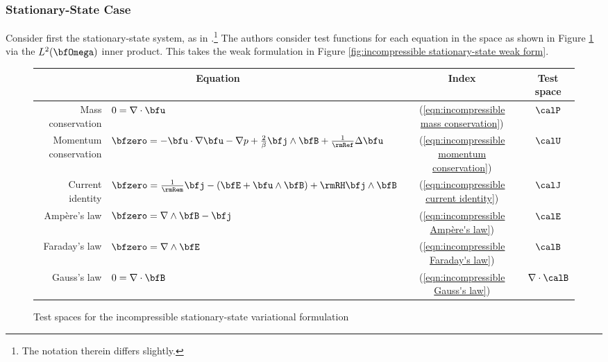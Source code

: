 \subsubsection*{Stationary-State Case}
    Consider first the stationary-state system, as in \cite{LHF22}.\footnote{The notation therein differs slightly.} The authors consider test functions for each equation in the space as shown in Figure \ref{fig:incompressible stationary-state test spaces} via the $L^{2}(\bfOmega)$ inner product. This takes the weak formulation in Figure \ref{fig:incompressible stationary-state weak form}.
    
    \begin{figure}
        \centering
        \begin{tabular}{ r l c | c }
            \multicolumn{2}{c}{Equation}  &  Index  &  Test space  \\
            \hline\hline
            Mass conservation  &  $0  =  \nabla\cdot\bfu$  &  (\ref{eqn:incompressible mass conservation})  &  $\calP$  \\
            Momentum conservation  &  $\bfzero 
             =  - \bfu\cdot\nabla\bfu - \nabla p + \frac{2}{\beta}\bfj\wedge\bfB + \frac{1}{\rmRef}\Delta\bfu$  &  (\ref{eqn:incompressible momentum conservation})  &  $\calU$  \\
            \hline
            Current identity  &  $\bfzero  =  \frac{1}{\rmRem}\bfj - (\bfE + \bfu\wedge\bfB) + \rmRH\bfj\wedge\bfB$  &  (\ref{eqn:incompressible current identity})  &  $\calJ$  \\
            \hline
            Ampère's law  &  $\bfzero  =  \nabla\wedge\bfB - \bfj$  &  (\ref{eqn:incompressible Ampère's law})  &  $\calE$  \\
            Faraday's law  &  $\bfzero  =  \nabla\wedge\bfE$  &  (\ref{eqn:incompressible Faraday's law})  &  $\calB$  \\
            Gauss's law  &  $0  =  \nabla\cdot\bfB$  &  (\ref{eqn:incompressible Gauss's law})  &  $\nabla\cdot\calB$  \\
        \end{tabular}
        \caption{Test spaces for the incompressible stationary-state variational formulation}
        \label{fig:incompressible stationary-state test spaces}
    \end{figure}

